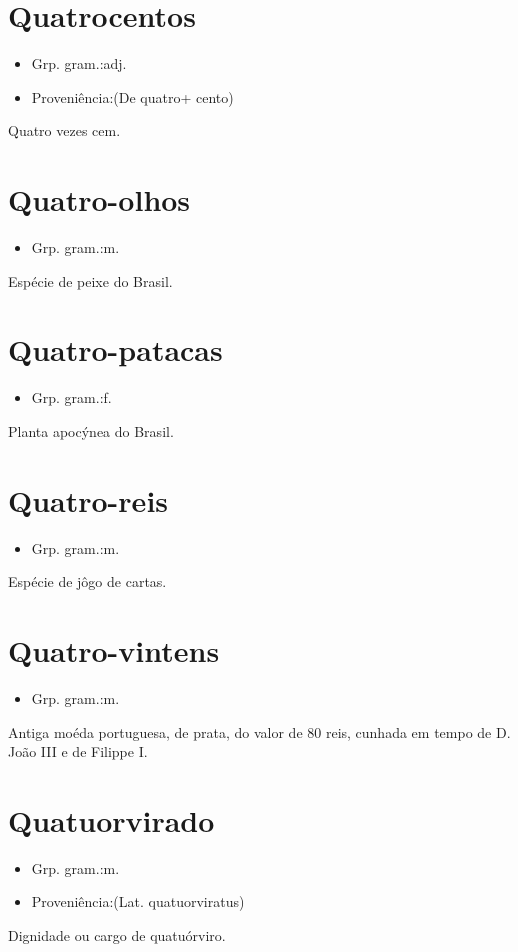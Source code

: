 \section{Quatrocentos}
\begin{itemize}
\item {Grp. gram.:adj.}
\end{itemize}
\begin{itemize}
\item {Proveniência:(De \textunderscore quatro\textunderscore  + \textunderscore cento\textunderscore )}
\end{itemize}
Quatro vezes cem.
\section{Quatro-olhos}
\begin{itemize}
\item {Grp. gram.:m.}
\end{itemize}
Espécie de peixe do Brasil.
\section{Quatro-patacas}
\begin{itemize}
\item {Grp. gram.:f.}
\end{itemize}
Planta apocýnea do Brasil.
\section{Quatro-reis}
\begin{itemize}
\item {Grp. gram.:m.}
\end{itemize}
Espécie de jôgo de cartas.
\section{Quatro-vintens}
\begin{itemize}
\item {Grp. gram.:m.}
\end{itemize}
Antiga moéda portuguesa, de prata, do valor de 80 reis, cunhada em tempo de D. João III e de Filippe I.
\section{Quatuorvirado}
\begin{itemize}
\item {Grp. gram.:m.}
\end{itemize}
\begin{itemize}
\item {Proveniência:(Lat. \textunderscore quatuorviratus\textunderscore )}
\end{itemize}
Dignidade ou cargo de quatuórviro.
